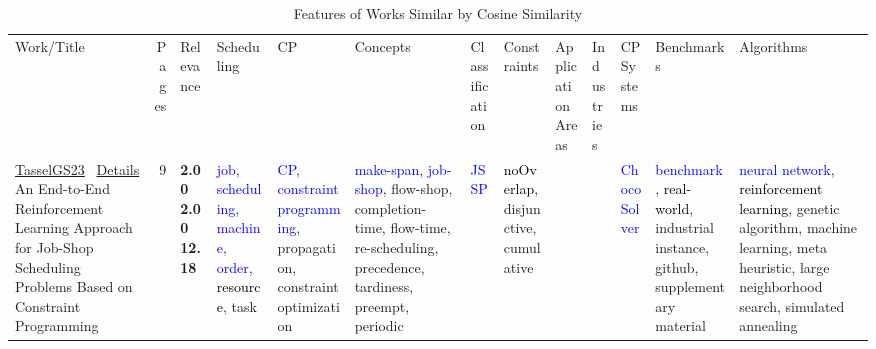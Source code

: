 {\scriptsize
\begin{longtable}{>{\raggedright\arraybackslash}p{3cm}r>{\raggedright\arraybackslash}p{1.0cm}>{\raggedright\arraybackslash}p{ 1.50cm}>{\raggedright\arraybackslash}p{ 1.50cm}>{\raggedright\arraybackslash}p{ 1.50cm}>{\raggedright\arraybackslash}p{ 1.50cm}>{\raggedright\arraybackslash}p{ 1.50cm}>{\raggedright\arraybackslash}p{ 1.50cm}>{\raggedright\arraybackslash}p{ 1.50cm}>{\raggedright\arraybackslash}p{ 1.50cm}>{\raggedright\arraybackslash}p{ 1.50cm}>{\raggedright\arraybackslash}p{ 1.50cm}}
\rowcolor{white}\caption{Features of Works Similar by Cosine Similarity}\\ \toprule
\rowcolor{white}Work/Title & Pages & Relevance & Scheduling& CP& Concepts& Classification& Constraints& ApplicationAreas& Industries& CPSystems& Benchmarks& Algorithms\\ \midrule\endhead
\bottomrule
\endfoot
\href{../scheduling/works/TasselGS23.pdf}{TasselGS23}~\cite{TasselGS23} \hyperref[detail:TasselGS23]{Details} An End-to-End Reinforcement Learning Approach for Job-Shop Scheduling Problems Based on Constraint Programming & 9 & \noindent{}\textbf{2.00} \textbf{2.00} \textbf{12.18} & \textcolor{blue}{job}, \textcolor{blue}{scheduling}, \textcolor{blue}{machine}, \textcolor{blue}{order}, \textcolor{black}{resource}, \textcolor{black!40}{task} & \textcolor{blue}{CP}, \textcolor{blue}{constraint programming}, \textcolor{black!40}{propagation}, \textcolor{black!40}{constraint optimization} & \textcolor{blue}{make-span}, \textcolor{blue}{job-shop}, \textcolor{black!40}{flow-shop}, \textcolor{black!40}{completion-time}, \textcolor{black!40}{flow-time}, \textcolor{black!40}{re-scheduling}, \textcolor{black!40}{precedence}, \textcolor{black!40}{tardiness}, \textcolor{black!40}{preempt}, \textcolor{black!40}{periodic} & \textcolor{blue}{JSSP} & \textcolor{black}{noOverlap}, \textcolor{black!40}{disjunctive}, \textcolor{black!40}{cumulative} &  &  & \textcolor{blue}{Choco Solver} & \textcolor{blue}{benchmark}, \textcolor{black}{real-world}, \textcolor{black!40}{industrial instance}, \textcolor{black!40}{github}, \textcolor{black!40}{supplementary material} & \textcolor{blue}{neural network}, \textcolor{black}{reinforcement learning}, \textcolor{black!40}{genetic algorithm}, \textcolor{black!40}{machine learning}, \textcolor{black!40}{meta heuristic}, \textcolor{black!40}{large neighborhood search}, \textcolor{black!40}{simulated annealing}\\

\end{longtable}}
